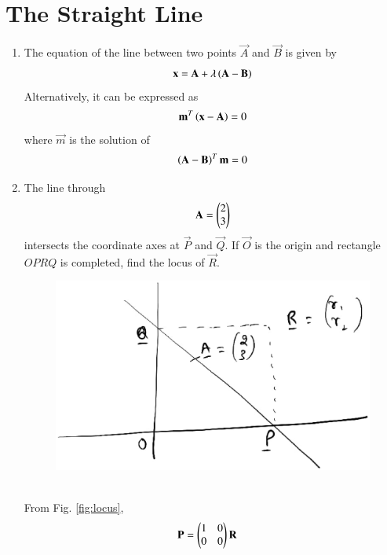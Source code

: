\documentclass[journal,12pt,twocolumn]{IEEEtran}
\renewcommand\thesection{\arabic{section}}
\begin{document}
\section{The Straight Line}
\begin{enumerate}[label=\thesection.\arabic*
,ref=\thesection.\theenumi]
\item The equation of the line between two points $\vec{A}$ and $\vec{B}$ is given by
\begin{equation}
\mathbf{x} = \mathbf{A} + \lambda \left(\mathbf{A}-\mathbf{B}\right)
\end{equation}
%
Alternatively, it can be expressed as
\begin{equation}
\label{eq:line_normal}
\mathbf{m}^T\left(\mathbf{x}-\mathbf{A}\right) = 0
\end{equation}
%
where $\vec{m}$ is the solution of
\begin{equation}
\label{eq:normal_slope}
\left(\mathbf{A}-\mathbf{B}\right)^T\mathbf{m} = 0
\end{equation}
\item The line through
\begin{equation}
\label{eq:locus}
\mathbf{A}=\begin{pmatrix}2\\3\end{pmatrix}
\end{equation}
intersects the coordinate axes at $\vec{P}$ and $\vec{Q}$. If $\vec{O}$ is the origin and rectangle $OPRQ$ is 
completed, find the locus of $\vec{R}$.
\begin{figure}
\centering
\includegraphics[width=\columnwidth]{./figs/locus.eps}
\caption{}
\label{fig:locus}
\end{figure}
\\
\solution From Fig. \eqref{fig:locus},
\begin{align}
\vec{P}&= \myvec{1 & 0\\ 0 & 0}\vec{R}
\label{eq:locusp}

\end{align}
\end{enumerate}
\end{document}
